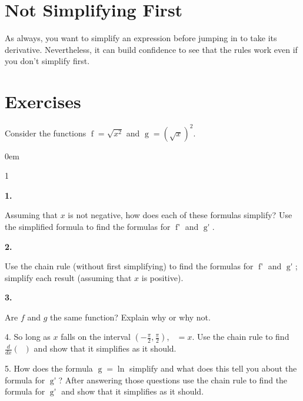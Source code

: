 \documentclass[12pt,]{book}
\theoremstyle{plain}
\theoremstyle{definition}
\numberwithin{equation}{section}
\newenvironment{exercisegroup}%
{\medskip\noindent}%
{\par\bigskip}%
\newlength{\exercisegroupindent}%
\newlength{\exercisegroupitemwidth}%
\newenvironment{exercisegrouplist}%
{\vspace{-\partopsep}%
\begin{adjustwidth}{\exercisegroupindent}{0em}}%
{\end{adjustwidth}%
\vspace{-\partopsep}%
\vspace{\baselineskip}}%
\newenvironment{exercisegroupbycol}[1]%
{\begin{exercisegrouplist}%
\vspace{-\multicolsep}%
\begin{multicols}{#1}%
\setlength{\parindent}{0em}%
\setlength{\exercisegroupitemwidth}{\linewidth}}%
{\end{multicols}%
\vspace{-\multicolsep}%
\end{exercisegrouplist}}%
\newenvironment{exercisegroupitem}[1]%
{\begin{minipage}[t]{\exercisegroupitemwidth}
\vspace{0pt}%
{\bfseries#1}%
\rule{0pt}{\baselineskip}}{\strut%
\end{minipage}%
\hspace{\columnsep}}%
\providecommand\phantomsection{}
\newcommand{\fe}[2]{\mathop{{#1}{\left(#2\right)}}}
\newcommand{\ointerval}[2]{\left(#1,#2\right)}
\newcommand{\fd}[1]{#1'}
\newcommand{\lzoo}[2]{{\frac{d}{d#1}}{\left(#2\right)}}
\begin{document}
\section[Not Simplifying First]{Not Simplifying First}\label{section-not-simplifying-first}
As always, you want to simplify an expression before jumping in to take its derivative.  Nevertheless, it can build confidence to see that the rules work even if you don't simplify first.%
\typeout{************************************************}
\typeout{************************************************}
\section*{Exercises}\label{exercises-42}

\begin{exercisegroup}%
Consider the functions \(\fe{f}{x}=\sqrt{x^2}\) and \(\fe{g}{x}=\left(\sqrt{x}\right)^2\).%
\par
\begin{exercisegroupbycol}{1}%
\begin{exercisegroupitem}{1. }\phantomsection\hypertarget{exercise-357}{\null}
Assuming that \(x\) is not negative, how does each of these formulas simplify?  Use the simplified formula to find the formulas for \(\fe{\fd{f}}{x}\) and \(\fe{\fd{g}}{x}\).%
\end{exercisegroupitem}%
\par%
\begin{exercisegroupitem}{2. }\phantomsection\hypertarget{exercise-358}{\null}
Use the chain rule (without first simplifying) to find the formulas for \(\fe{\fd{f}}{x}\) and \(\fe{\fd{g}}{x}\); simplify each result (assuming that \(x\) is positive).%
\end{exercisegroupitem}%
\par%
\begin{exercisegroupitem}{3. }\phantomsection\hypertarget{exercise-359}{\null}
Are \(f\) and \(g\) the same function? Explain why or why not.%
\end{exercisegroupitem}%
\par%
\end{exercisegroupbycol}%
\end{exercisegroup}%
\begin{exerciselist}
\item[4.]\phantomsection\hypertarget{exercise-360}{\null}So long as \(x\) falls on the interval \(\ointerval{-\frac{\pi}{2}}{\frac{\pi}{2}}\), \(\fe{\tan^{-1}}{\fe{\tan}{x}}=x\). Use the chain rule to find \(\lzoo{x}{\fe{\tan^{-1}}{\fe{\tan}{x}}}\) and show that it simplifies as it should.%
\par\smallskip
\item[5.]\phantomsection\hypertarget{exercise-361}{\null}How does the formula \(\fe{g}{t}=\fe{\ln}{e^{5t}}\) simplify and what does this tell you about the formula for \(\fe{\fd{g}}{t}\)?  After answering those questions use the chain rule to find the formula for \(\fe{\fd{g}}{t}\) and show that it simplifies as it should.%
\par\smallskip
\end{exerciselist}
\end{document}
